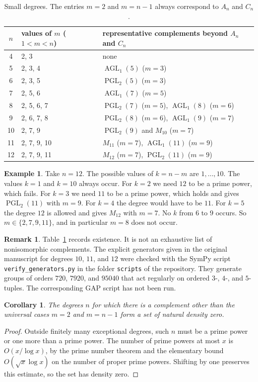 \documentclass[12pt,letterpaper]{article}
\numberwithin{equation}{section}
\newtheorem{corollary}[theorem]{Corollary}
\theoremstyle{definition}
\newtheorem{example}[theorem]{Example}
\newtheorem{vremark}{Remark}
\DeclareMathOperator{\agll}{AGL}
\DeclareMathOperator{\pgll}{PGL}
\begin{document}
\begin{table}[ht]
\centering\small
\begin{tabular}{@{}cll@{}}\toprule
$n$ & values of $m$ ($1<m<n$) & representative complements beyond $A_n$ and $C_n$\\\midrule
4 & 2, 3 & none\\
5 & 2, 3, 4 & $\agll_1(5)$ ($m=3$)\\
6 & 2, 3, 5 & $\pgll_2(5)$ ($m=3$)\\
7 & 2, 5, 6 & $\agll_1(7)$ ($m=5$)\\
8 & 2, 5, 6, 7 & $\pgll_2(7)$ ($m=5$), $\agll_1(8)$ ($m=6$)\\
9 & 2, 6, 7, 8 & $\pgll_2(8)$ ($m=6$), $\agll_1(9)$ ($m=7$)\\
10 & 2, 7, 9 & $\pgll_2(9)$ and $M_{10}$ ($m=7$)\\
11 & 2, 7, 9, 10 & $M_{11}$ ($m=7$), $\agll_1(11)$ ($m=9$)\\
12 & 2, 7, 9, 11 & $M_{12}$ ($m=7$), $\pgll_2(11)$ ($m=9$)\\
\bottomrule
\end{tabular}
\caption{Small degrees. The entries $m=2$ and $m=n-1$ always correspond to $A_n$ and $C_n$.}\label{tab:small}
\end{table}
\begin{example}\label{ex:n12}
Take $n=12$. The possible values of $k=n-m$ are $1,\ldots,10$. The values $k=1$ and $k=10$ always occur. For $k=2$ we need $12$ to be a prime power, which fails. For $k=3$ we need $11$ to be a prime power, which holds and gives $\pgll_2(11)$ with $m=9$. For $k=4$ the degree would have to be $11$. For $k=5$ the degree $12$ is allowed and gives $M_{12}$ with $m=7$. No $k$ from $6$ to $9$ occurs. So $m\in\{2,7,9,11\}$, and in particular $m=8$ does not occur.
\end{example}
\begin{vremark}\label{rem:verification}
Table~\ref{tab:small} records existence. It is not an exhaustive list of nonisomorphic complements. The explicit generators given in the original manuscript for degrees $10$, $11$, and $12$ were checked with the SymPy script \texttt{verify\_generators.py} in the folder \texttt{scripts} of the repository. They generate groups of orders $720$, $7920$, and $95040$ that act regularly on ordered $3$-, $4$-, and $5$-tuples. The corresponding GAP script has not been run.
\end{vremark}
\begin{corollary}\label{cor:density}
The degrees $n$ for which there is a complement other than the universal cases $m=2$ and $m=n-1$ form a set of natural density zero.
\end{corollary}
\begin{proof}
Outside finitely many exceptional degrees, such $n$ must be a prime power or one more than a prime power. The number of prime powers at most $x$ is $O(x/\log x)$, by the prime number theorem and the elementary bound $O(\sqrt x\log x)$ on the number of proper prime powers. Shifting by one preserves this estimate, so the set has density zero.
\end{proof}
\end{document}
